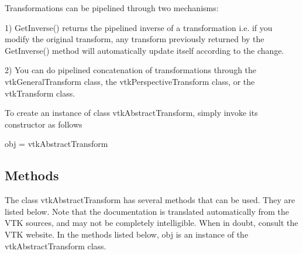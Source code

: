 Transformations can be pipelined through two mechanisms\-: 

1) Get\-Inverse() returns the pipelined inverse of a transformation i.\-e. if you modify the original transform, any transform previously returned by the Get\-Inverse() method will automatically update itself according to the change. 

2) You can do pipelined concatenation of transformations through the vtk\-General\-Transform class, the vtk\-Perspective\-Transform class, or the vtk\-Transform class.

To create an instance of class vtk\-Abstract\-Transform, simply invoke its constructor as follows \begin{DoxyVerb}  obj = vtkAbstractTransform
\end{DoxyVerb}
 \hypertarget{vtkwidgets_vtkxyplotwidget_Methods}{}\subsection{Methods}\label{vtkwidgets_vtkxyplotwidget_Methods}
The class vtk\-Abstract\-Transform has several methods that can be used. They are listed below. Note that the documentation is translated automatically from the V\-T\-K sources, and may not be completely intelligible. When in doubt, consult the V\-T\-K website. In the methods listed below, {\ttfamily obj} is an instance of the vtk\-Abstract\-Transform class. 
